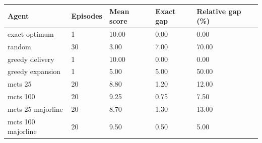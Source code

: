 \begin{tabular}{lllll}
\hline
Agent & Episodes & Mean score & Exact gap & Relative gap (\%) \\
\hline
exact optimum & 1 & 10.00 & 0.00 & 0.00 \\
random & 30 & 3.00 & 7.00 & 70.00 \\
greedy delivery & 1 & 10.00 & 0.00 & 0.00 \\
greedy expansion & 1 & 5.00 & 5.00 & 50.00 \\
mcts 25 & 20 & 8.80 & 1.20 & 12.00 \\
mcts 100 & 20 & 9.25 & 0.75 & 7.50 \\
mcts 25 majorline & 20 & 8.70 & 1.30 & 13.00 \\
mcts 100 majorline & 20 & 9.50 & 0.50 & 5.00 \\
\hline
\end{tabular}
